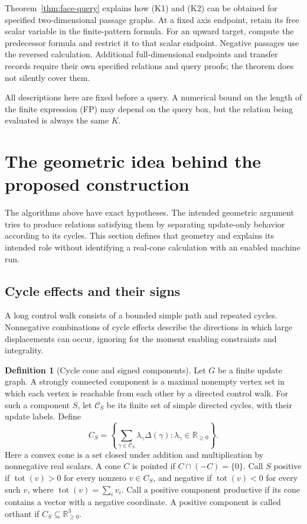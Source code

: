 \documentclass[11pt,a4paper]{article}
\theoremstyle{definition}
\newtheorem{definition}[theorem]{Definition}
\theoremstyle{remark}
\newcommand{\R}{\mathbb R}
\newcommand{\tot}[1]{\operatorname{tot}(#1)}
\begin{document}
Theorem~\ref{thm:face-query} explains how (K1) and (K2) can be obtained
for specified two-dimensional passage graphs. At a fixed axis
endpoint, retain its free scalar variable in the finite-pattern
formula. For an upward target, compute the predecessor formula and
restrict it to that scalar endpoint. Negative passages use the
reversed calculation. Additional full-dimensional endpoints and
transfer records require their own specified relations and query
proofs; the theorem does not silently cover them.

All descriptions here are fixed before a query. A numerical bound
on the length of the finite expression (FP) may depend on the query
box, but the relation being evaluated is always the same \(K\).



\section{The geometric idea behind the proposed construction}
\label{sec:geometry}

The algorithms above have exact hypotheses. The intended geometric
argument tries to produce relations satisfying them by separating
update-only behavior according to its cycles. This section defines
that geometry and explains its intended role without identifying a
real-cone calculation with an enabled machine run.

\subsection{Cycle effects and their signs}

A long control walk consists of a bounded simple path and repeated
cycles. Nonnegative combinations of cycle effects describe the
directions in which large displacements can occur, ignoring for the
moment enabling constraints and integrality.

\begin{definition}[Cycle cone and signed components]
\label{def:cycle-cone}
Let \(G\) be a finite update graph. A strongly connected component
is a maximal nonempty vertex set in which each vertex is reachable
from each other by a directed control walk.
For such a component \(S\), let \(\mathcal C_S\) be its finite set
of simple directed cycles, with their update labels. Define
\[
 C_S=\left\{\sum_{\gamma\in\mathcal C_S}
          \lambda_\gamma\Delta(\gamma):
                         \lambda_\gamma\in\R_{\ge0}\right\}.
\]
Here a convex cone is a set closed under addition and multiplication
by nonnegative real scalars. A cone \(C\) is pointed if
\(C\cap(-C)=\{0\}\).
Call \(S\) positive if
\(\tot v>0\) for every nonzero \(v\in C_S\), and negative if
\(\tot v<0\) for every such \(v\), where \(\tot v=\sum_i v_i\).
Call a positive component productive if its cone contains a vector
with a negative coordinate. A positive component is called orthant
if \(C_S\subseteq\R_{\ge0}^3\).
\end{definition}
\end{document}
